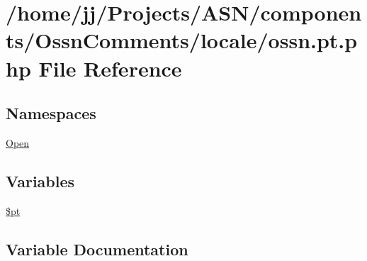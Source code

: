\hypertarget{components_2_ossn_comments_2locale_2ossn_8pt_8php}{}\section{/home/jj/\+Projects/\+A\+S\+N/components/\+Ossn\+Comments/locale/ossn.pt.\+php File Reference}
\label{components_2_ossn_comments_2locale_2ossn_8pt_8php}
\subsection*{Namespaces}
\begin{DoxyCompactItemize}
\item 
 \hyperlink{namespace_open}{Open}
\end{DoxyCompactItemize}
\subsection*{Variables}
\begin{DoxyCompactItemize}
\item 
\hyperlink{components_2_ossn_comments_2locale_2ossn_8pt_8php_a62c150775a7a00e8663463c638016cad}{\$pt}
\end{DoxyCompactItemize}


\subsection{Variable Documentation}
